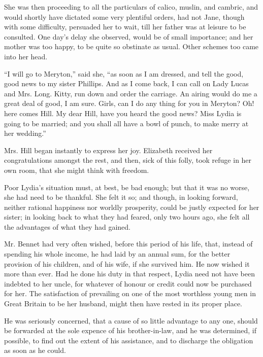 She was then proceeding to all the particulars of calico,
muslin, and cambric, and would shortly have dictated
some very plentiful orders, had not Jane, though with
some difficulty, persuaded her to wait, till her father was
at leisure to be consulted. One day’s delay she observed,
would be of small importance; and her mother was too
happy, to be quite so obstinate as usual. Other schemes
too came into her head.

“I will go to Meryton,” said she, “as soon as I am
dressed, and tell the good, good news to my sister Phillips.
And as I come back, I can call on Lady Lucas and Mrs.
Long. Kitty, run down and order the carriage. An
airing would do me a great deal of good, I am sure. Girls,
can I do any thing for you in Meryton? Oh! here comes
Hill. My dear Hill, have you heard the good news? Miss
Lydia is going to be married; and you shall all have a
bowl of punch, to make merry at her wedding.”

Mrs. Hill began instantly to express her joy. Elizabeth
received her congratulations amongst the rest, and then,
sick of this folly, took refuge in her own room, that she
might think with freedom.

Poor Lydia’s situation must, at best, be bad enough;
but that it was no worse, she had need to be thankful.
She felt it so; and though, in looking forward, neither
rational happiness nor worldly prosperity, could be justly
expected for her sister; in looking back to what they
had feared, only two hours ago, she felt all the advantages
of what they had gained.


Mr. Bennet had very often wished, before this period
of his life, that, instead of spending his whole income, he
had laid by an annual sum, for the better provision of
his children, and of his wife, if she survived him. He now
wished it more than ever. Had he done his duty in that
respect, Lydia need not have been indebted to her uncle,
for whatever of honour or credit could now be purchased
for her. The satisfaction of prevailing on one of the most
worthless young men in Great Britain to be her husband,
might then have rested in its proper place.

He was seriously concerned, that a cause of so little
advantage to any one, should be forwarded at the sole
expence of his brother-in-law, and he was determined,
if possible, to find out the extent of his assistance, and to
discharge the obligation as soon as he could.

